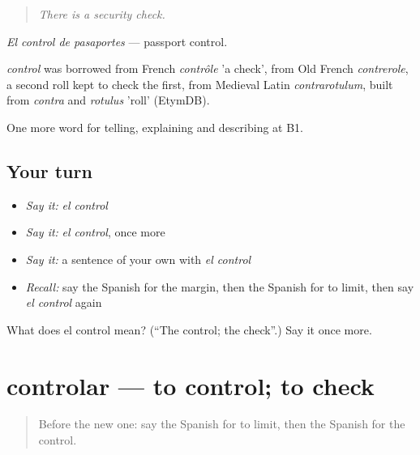\begin{quote}
\emph{There is a security check.}
\end{quote}

\emph{El control de pasaportes} — passport control.

\begin{cousinweb}
\emph{control} was borrowed from French \emph{contrôle} 'a check', from Old French \emph{contrerole}, a second roll kept to check the first, from Medieval Latin \emph{contrarotulum}, built from \emph{contra} and \emph{rotulus} 'roll' (EtymDB).
\end{cousinweb}

\begin{grammarlens}[title={What you've built}]
One more word for telling, explaining and describing at B1.
\end{grammarlens}

\subsection*{Your turn}
\begin{itemize}
\raggedright
  \item \emph{Say it:} \emph{el control}
  \item \emph{Say it:} \emph{el control}, once more
  \item \emph{Say it:} a sentence of your own with \emph{el control}
  \item \emph{Recall:} say the Spanish for the margin, then the Spanish for to limit, then say \emph{el control} again
\end{itemize}

\begin{tcolorbox}[breakable,colback=teal!4,colframe=teal!35!black,title={Before you move on}]
What does el control mean? (\textquotedblleft{}The control; the check\textquotedblright{}.) Say it once more.
\end{tcolorbox}
\section[controlar]{controlar — to control; to check}

\label{lesson:ES-C638-controlar}



\begin{quote}
Before the new one: say the Spanish for to limit, then the Spanish for the control.
\end{quote}

